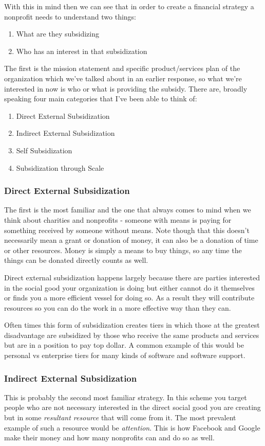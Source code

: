 \documentclass[10pt,a5paper]{book}
\begin{document}
With this in mind then we can see that in order to create a financial strategy a nonprofit needs to understand two things:
\begin{enumerate}
\item What are they subsidizing
\item Who has an interest in that subsidization
\end{enumerate}

The first is the mission statement and specific product/services plan of the organization which we've talked about in an earlier response, so what we're interested in now is who or what is providing the subsidy. There are, broadly speaking four main categories that I've been able to think of:
\begin{enumerate}
\item Direct External Subsidization
\item Indirect External Subsidization
\item Self Subsidization
\item Subsidization through Scale
\end{enumerate}

\subsubsection{Direct External Subsidization}
The first is the most familiar and the one that always comes to mind when we think about charities and nonprofits - someone with means is paying for something received by someone without means. Note though that this doesn't necessarily mean a grant or donation of money, it can also be a donation of time or other resources. Money is simply a means to buy things, so any time the things can be donated directly counts as well. 

Direct external subsidization happens largely because there are parties interested in the social good your organization is doing but either cannot do it themselves or finds you a more efficient vessel for doing so. As a result they will contribute resources so you can do the work in a more effective way than they can.

Often times this form of subsidization creates tiers in which those at the greatest disadvantage are subsidized by those who receive the same products and services but are in a position to pay top dollar. A common example of this would be personal vs enterprise tiers for many kinds of software and software support. 

\subsubsection{Indirect External Subsidization}
This is probably the second most familiar strategy. In this scheme you target people who are not necessary interested in the direct social good you are creating but in some \textit{resultant resource} that will come from it. The most prevalent example of such a resource would be \textit{attention}. This is how Facebook and Google make their money and how many nonprofits can and do so as well. 
\end{document}
